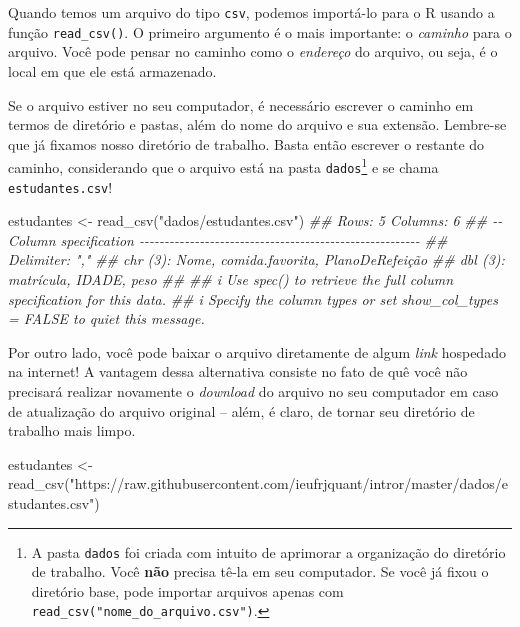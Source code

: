 \documentclass[
  letterpaper,
  DIV=11,
  numbers=noendperiod]{scrreprt}
\newenvironment{Shaded}{\begin{snugshade}}{\end{snugshade}}
\newcommand{\DocumentationTok}[1]{\textcolor[rgb]{0.37,0.37,0.37}{\textit{#1}}}
\newcommand{\FunctionTok}[1]{\textcolor[rgb]{0.28,0.35,0.67}{#1}}
\newcommand{\NormalTok}[1]{\textcolor[rgb]{0.00,0.23,0.31}{#1}}
\newcommand{\OtherTok}[1]{\textcolor[rgb]{0.00,0.23,0.31}{#1}}
\newcommand{\StringTok}[1]{\textcolor[rgb]{0.13,0.47,0.30}{#1}}
\begin{document}
Quando temos um arquivo do tipo \texttt{csv}, podemos importá-lo para o
R usando a função \texttt{read\_csv()}. O primeiro argumento é o mais
importante: o \emph{caminho} para o arquivo. Você pode pensar no caminho
como o \emph{endereço} do arquivo, ou seja, é o local em que ele está
armazenado.

Se o arquivo estiver no seu computador, é necessário escrever o caminho
em termos de diretório e pastas, além do nome do arquivo e sua extensão.
Lembre-se que já fixamos nosso diretório de trabalho. Basta então
escrever o restante do caminho, considerando que o arquivo está na pasta
\texttt{dados}\footnote{A pasta \texttt{dados} foi criada com intuito de
  aprimorar a organização do diretório de trabalho. Você \textbf{não}
  precisa tê-la em seu computador. Se você já fixou o diretório base,
  pode importar arquivos apenas com
  \texttt{read\_csv("nome\_do\_arquivo.csv")}.} e se chama
\texttt{estudantes.csv}!

\begin{Shaded}
\begin{Highlighting}[]
\NormalTok{estudantes }\OtherTok{\textless{}{-}} \FunctionTok{read\_csv}\NormalTok{(}\StringTok{"dados/estudantes.csv"}\NormalTok{)}
\DocumentationTok{\#\# Rows: 5 Columns: 6}
\DocumentationTok{\#\# {-}{-} Column specification {-}{-}{-}{-}{-}{-}{-}{-}{-}{-}{-}{-}{-}{-}{-}{-}{-}{-}{-}{-}{-}{-}{-}{-}{-}{-}{-}{-}{-}{-}{-}{-}{-}{-}{-}{-}{-}{-}{-}{-}{-}{-}{-}{-}{-}{-}{-}{-}{-}{-}{-}{-}{-}{-}{-}{-}}
\DocumentationTok{\#\# Delimiter: ","}
\DocumentationTok{\#\# chr (3): Nome, comida.favorita, PlanoDeRefeição}
\DocumentationTok{\#\# dbl (3): matrícula, IDADE, peso}
\DocumentationTok{\#\# }
\DocumentationTok{\#\# i Use \textasciigrave{}spec()\textasciigrave{} to retrieve the full column specification for this data.}
\DocumentationTok{\#\# i Specify the column types or set \textasciigrave{}show\_col\_types = FALSE\textasciigrave{} to quiet this message.}
\end{Highlighting}
\end{Shaded}

Por outro lado, você pode baixar o arquivo diretamente de algum
\emph{link} hospedado na internet! A vantagem dessa alternativa consiste
no fato de quê você não precisará realizar novamente o \emph{download}
do arquivo no seu computador em caso de atualização do arquivo original
-- além, é claro, de tornar seu diretório de trabalho mais limpo.

\begin{Shaded}
\begin{Highlighting}[]
\NormalTok{estudantes }\OtherTok{\textless{}{-}} \FunctionTok{read\_csv}\NormalTok{(}\StringTok{"https://raw.githubusercontent.com/ieufrjquant/intror/master/dados/estudantes.csv"}\NormalTok{)}
\end{Highlighting}
\end{Shaded}
\end{document}
